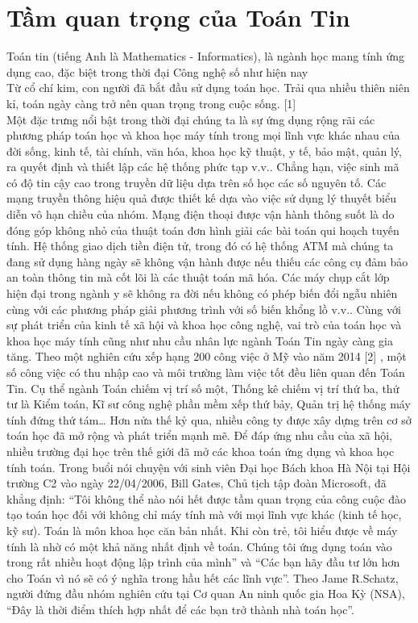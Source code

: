 \documentclass[12pt,a4paper]{report}
\begin{document}
    \section{Tầm quan trọng của Toán Tin}
    Toán tin (tiếng Anh là Mathematics - Informatics), là ngành học mang tính ứng dụng cao, đặc biệt trong thời đại Công nghệ số như hiện nay \\
    Từ cổ chí kim, con người đã bắt đầu sử dụng toán học. Trải qua nhiều thiên niên kỉ, toán ngày càng trở nên quan trọng trong cuộc sống.  [1]\\
    Một đặc trưng nổi bật trong thời đại chúng ta là sự ứng dụng rộng rãi các phương pháp toán học và khoa học máy tính trong mọi lĩnh vực khác nhau của đời sống,  kinh tế, tài chính, văn hóa, khoa học kỹ thuật, y tế, bảo mật, quản lý, ra quyết định và thiết lập các hệ thống phức tạp v.v.. Chẳng hạn, việc sinh mã có độ tin cậy cao trong truyền dữ liệu dựa trên số học các số nguyên tố. Các mạng truyền thông hiệu quả được thiết kế dựa vào việc sử dụng lý thuyết biểu diễn vô hạn chiều của nhóm. Mạng điện thoại được vận hành thông suốt là do đóng góp không nhỏ của thuật toán đơn hình giải các bài toán qui hoạch tuyến tính. Hệ thống giao dịch tiền điện tử, trong đó có hệ thống ATM mà chúng ta đang sử dụng hàng ngày sẽ không vận hành được nếu thiếu các công cụ đảm bảo an toàn thông tin mà cốt lõi là các thuật toán mã hóa. Các máy chụp cắt lớp hiện đại trong ngành y sẽ không ra đời nếu không có phép biến đổi ngẫu nhiên cùng với các phương pháp giải phương trình với số biến khổng lồ v.v..\newpage
    Cùng với sự phát triển của kinh tế xã hội và khoa học công nghệ, vai trò của toán học và khoa học máy tính cũng như nhu cầu nhân lực ngành Toán Tin ngày càng gia tăng. Theo một nghiên cứu xếp hạng 200 công việc ở Mỹ  vào năm 2014 [2] , một  số công việc có thu nhập cao và môi trường làm việc tốt đều liên quan đến Toán Tin. Cụ thể ngành Toán chiếm vị trí số một, Thống kê chiếm vị trí thứ ba, thứ tư là Kiểm toán, Kĩ sư công nghệ phần mềm xếp thứ bảy, Quản trị hệ thống máy tính đứng thứ tám… Hơn nửa thế kỷ qua, nhiều công ty được xây dựng trên cơ sở toán học đã mở rộng và phát triển mạnh mẽ. Để đáp ứng nhu cầu của xã hội, nhiều trường đại học trên thế giới đã mở các khoa toán ứng dụng và khoa học tính toán. Trong buổi nói chuyện với sinh viên Đại học Bách khoa Hà Nội tại Hội trường C2 vào ngày 22/04/2006, Bill Gates, Chủ tịch tập đoàn Microsoft, đã khẳng định:  “Tôi không thể nào nói hết được tầm quan trọng của công cuộc đào tạo toán học đối với không chỉ máy tính mà với mọi lĩnh vực khác (kinh tế học, kỹ sư). Toán là môn khoa học căn bản nhất. Khi còn trẻ, tôi hiểu được về máy tính là nhờ có một khả năng nhất định về toán. Chúng tôi ứng dụng toán vào trong rất nhiều hoạt động lập trình của mình” và “Các bạn hãy đầu tư lớn hơn cho Toán vì nó sẽ có ý nghĩa trong hầu hết các lĩnh vực”. Theo Jame R.Schatz, người đứng đầu nhóm nghiên cứu tại Cơ quan An ninh quốc gia Hoa Kỳ (NSA), “Đây là thời điểm thích hợp nhất để các bạn trở thành nhà toán học”.\\
\end{document}
